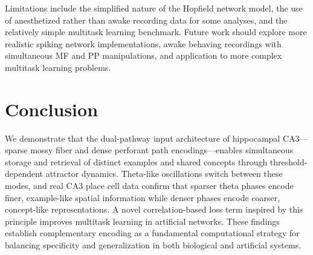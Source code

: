 \documentclass[11pt]{article}
\begin{document}
Limitations include the simplified nature of the Hopfield network model, the use of anesthetized rather than awake recording data for some analyses, and the relatively simple multitask learning benchmark. Future work should explore more realistic spiking network implementations, awake behaving recordings with simultaneous MF and PP manipulations, and application to more complex multitask learning problems.

\section{Conclusion}

We demonstrate that the dual-pathway input architecture of hippocampal CA3---sparse mossy fiber and dense perforant path encodings---enables simultaneous storage and retrieval of distinct examples and shared concepts through threshold-dependent attractor dynamics. Theta-like oscillations switch between these modes, and real CA3 place cell data confirm that sparser theta phases encode finer, example-like spatial information while denser phases encode coarser, concept-like representations. A novel correlation-based loss term inspired by this principle improves multitask learning in artificial networks. These findings establish complementary encoding as a fundamental computational strategy for balancing specificity and generalization in both biological and artificial systems.



\end{document}
